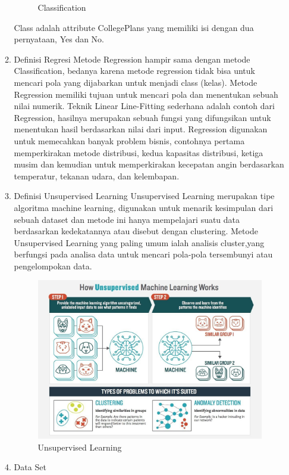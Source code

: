 \begin{enumerate}
\begin{enumerate}
\begin{figure}[h]
	\centering
	\caption{Classification}
\end{figure}
\hfill\break
Class adalah attribute CollegePlans yang memiliki isi dengan dua pernyataan, Yes dan No.
\item Definisi Regresi
\hfill\break
Metode Regression hampir sama dengan metode Classification, bedanya karena  metode regression tidak bisa untuk mencari pola yang dijabarkan untuk menjadi class (kelas). 
\hfill\break
Metode Regression memiliki tujuan untuk mencari pola dan menentukan sebuah nilai numerik. Teknik Linear Line-Fitting sederhana adalah contoh dari Regression, hasilnya merupakan sebuah fungsi yang difungsikan untuk menentukan hasil berdasarkan nilai dari input. 
\hfill\break
Regression digunakan untuk memecahkan banyak problem bisnis, contohnya pertama memperkirakan metode distribusi, kedua kapasitas distribusi, ketiga musim dan kemudian untuk memperkirakan kecepatan angin berdasarkan temperatur, tekanan udara, dan kelembapan.
\item Definisi Unsupervised Learning
\hfill\break
Unsupervised Learning merupakan tipe algoritma machine learning, digunakan untuk menarik kesimpulan dari sebuah dataset dan metode ini hanya mempelajari suatu data berdasarkan kedekatannya atau disebut dengan clustering. Metode Unsupervised Learning yang paling umum ialah analisis cluster,yang berfungsi pada analisa data untuk mencari pola-pola tersembunyi atau pengelompokan data.
\begin{figure}[h]
	\includegraphics[width=1\textwidth]{figures/1184065/UnsupervisedLearning.jpg}
	\centering
	\caption{Unsupervised Learning}
\end{figure}
\item Data Set

\end{enumerate}
\end{enumerate}
